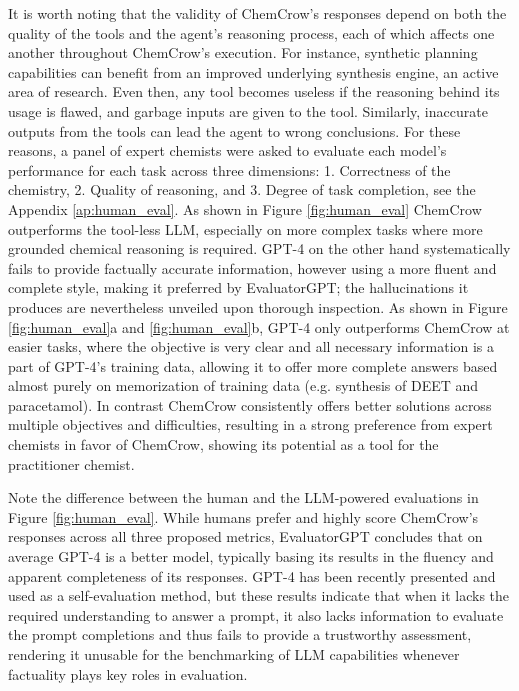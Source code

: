 \documentclass[10pt]{article}
\begin{document}
It is worth noting that the validity of ChemCrow's responses depend on both the quality of the tools and the agent's reasoning process, each of which affects one another throughout ChemCrow's execution. For instance, synthetic planning capabilities can benefit from an improved underlying synthesis engine, an active area of research\cite{synthia, coley2019robotic, thakkar2021artificial}. Even then, any tool becomes useless if the reasoning behind its usage is flawed, and garbage inputs are given to the tool. Similarly, inaccurate outputs from the tools can lead the agent to wrong conclusions. For these reasons, a panel of expert chemists were asked to evaluate each model's performance for each task across three dimensions: 1. Correctness of the chemistry, 2. Quality of reasoning, and 3. Degree of task completion, see the Appendix \ref{ap:human_eval}. As shown in Figure \ref{fig:human_eval} ChemCrow outperforms the tool-less LLM, especially on more complex tasks where more grounded chemical reasoning is required. GPT-4 on the other hand systematically fails to provide factually accurate information, however using a more fluent and complete style, making it preferred by EvaluatorGPT; the hallucinations it produces are nevertheless unveiled upon thorough inspection. As shown in Figure \ref{fig:human_eval}a and \ref{fig:human_eval}b, GPT-4 only outperforms ChemCrow at easier tasks, where the objective is very clear and all necessary information is a part of GPT-4's training data, allowing it to offer more complete answers based almost purely on memorization of training data (e.g. synthesis of DEET and paracetamol). In contrast ChemCrow consistently offers better solutions across multiple objectives and difficulties, resulting in a strong preference from expert chemists in favor of ChemCrow, showing its potential as a tool for the practitioner chemist. 




Note the difference between the human and the LLM-powered evaluations in Figure \ref{fig:human_eval}. While humans prefer and highly score ChemCrow's responses across all three proposed metrics, EvaluatorGPT concludes that on average GPT-4 is a better model, typically basing its results in the fluency and apparent completeness of its responses. GPT-4 has been recently presented and used as a self-evaluation method\cite{sparksofagi, liu2023gpteval}, but these results indicate that when it lacks the required understanding to answer a prompt, it also lacks information to evaluate the prompt completions and thus fails to provide a trustworthy assessment, rendering it unusable for the benchmarking of LLM capabilities whenever factuality plays key roles in evaluation.
\end{document}
